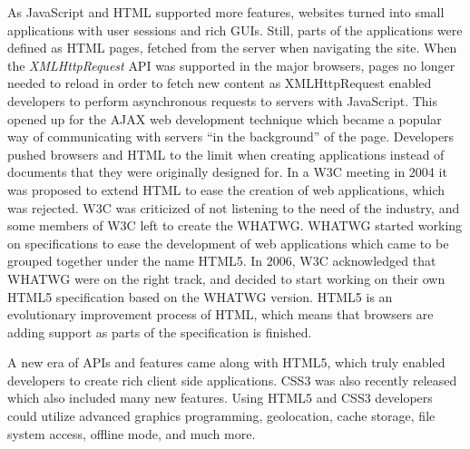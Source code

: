 \documentclass[a4paper,11pt]{kth-mag}
\begin{document}
        As \gls{JavaScript} and \gls{HTML} supported more features, websites turned into small applications with user sessions and rich \glspl{GUI}.
        Still, parts of the applications were defined as \gls{HTML} pages, fetched from the server when navigating the site.
        When the \emph{XMLHttpRequest} \gls{API} was supported in the major \glspl{browser}, pages no longer needed to reload in order to fetch new content as XMLHttpRequest enabled developers to perform asynchronous requests to servers with \gls{JavaScript}.
        This opened up for the \gls{AJAX} \gls{web} development technique which became a popular way of communicating with servers ``in the background'' of the page.
        Developers pushed \glspl{browser} and \gls{HTML} to the limit when creating applications instead of documents that they were originally designed for.
        In a \gls{W3C} meeting in 2004 it was proposed to extend \gls{HTML} to ease the creation of \gls{web} applications, which was rejected.
        \gls{W3C} was criticized of not listening to the need of the industry, and some members of \gls{W3C} left to create the \gls{WHATWG}.
        \gls{WHATWG} started working on specifications to ease the development of \gls{web} applications which came to be grouped together under the name \gls{HTML5}.
        In 2006, \gls{W3C} acknowledged that \gls{WHATWG} were on the right track, and decided to start working on their own \gls{HTML5} specification based on the \gls{WHATWG} version.
        \gls{HTML5} is an evolutionary improvement process of \gls{HTML}, which means that \glspl{browser} are adding support as parts of the specification is finished.

        A new era of \glspl{API} and features came along with \gls{HTML5}, which truly enabled developers to create rich client side applications.
        \gls{CSS3} was also recently released which also included many new features.
        Using \gls{HTML5} and \gls{CSS3} developers could utilize advanced graphics programming, geolocation, cache storage, file system access, offline mode, and much more.

\end{document}
